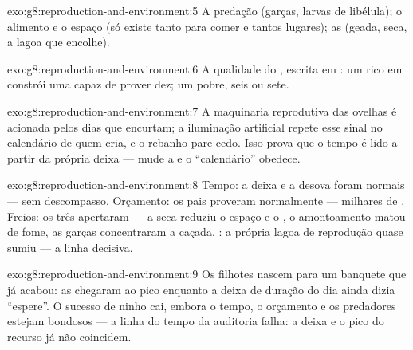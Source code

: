 \begin{solution}{exo:g8:reproduction-and-environment:5}
A predação (garças, larvas de libélula); o alimento e o espaço (só
existe tanto para comer e tantos lugares); as  (geada, seca,
a lagoa que encolhe).
\end{solution}

\begin{solution}{exo:g8:reproduction-and-environment:6}
A qualidade do , escrita em : um  rico em 
constrói uma  capaz de prover dez; um  pobre, seis ou
sete.
\end{solution}

\begin{solution}{exo:g8:reproduction-and-environment:7}
A maquinaria reprodutiva das ovelhas é acionada pelos dias que
encurtam; a iluminação artificial repete esse sinal no calendário de
quem cria, e o rebanho pare cedo. Isso prova que o tempo é lido a
partir da própria deixa --- mude a  e o ``calendário'' obedece.
\end{solution}

\begin{solution}{exo:g8:reproduction-and-environment:8}
Tempo: a deixa e a desova foram normais --- sem descompasso. Orçamento:
os pais proveram normalmente --- milhares de . Freios: os três
apertaram --- a seca reduziu o espaço e o , o amontoamento
matou de fome, as garças concentraram a caçada. : a própria
lagoa de reprodução quase sumiu --- a linha decisiva.
\end{solution}

\begin{solution}{exo:g8:reproduction-and-environment:9}
Os filhotes nascem para um banquete que já acabou: as 
chegaram ao pico enquanto a deixa de duração do dia ainda dizia
``espere''. O sucesso de ninho cai, embora o tempo, o orçamento e os
predadores estejam bondosos --- a linha do tempo da auditoria falha: a
deixa e o pico do recurso já não coincidem.
\end{solution}

